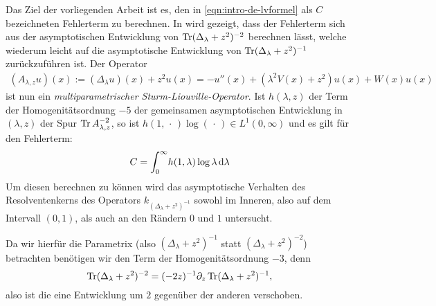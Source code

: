Das Ziel der vorliegenden Arbeit ist es, den in \cref{eqn:intro-de-lvformel} als
$C$ bezeichneten Fehlerterm zu berechnen. In \cite{LV13} wird gezeigt, dass der
Fehlerterm sich aus der asymptotischen Entwicklung von $\Tr(\Delta_\lambda +
z^2)^{-2}$ berechnen lässt, welche wiederum leicht auf die asymptotische
Entwicklung von $\Tr(\Delta_\lambda + z^2)^{-1}$ zurückzuführen ist. Der
Operator
\begin{align*}
  (A_{\lambda,z}u)(x) := (\Delta_\lambda u)(x) + z^2 u(x)
           = -u''(x) + (\lambda^2 V(x) + z^2) u(x) + W(x) u(x)
\end{align*}
ist nun ein \emph{multiparametrischer Sturm-Liouville-Operator}. Ist $h(\lambda,
z)$ der Term der Homogenitätsordnung $-5$ der gemeinsamen asymptotischen
Entwicklung in $(\lambda,z)$ der Spur $\Tr A_{\lambda,z}^{-2}$, so ist
$h(1,\,\cdot\,)\log(\,\cdot\,)\in L^1(0,\infty)$ und es gilt für den Fehlerterm:
\begin{align*}
  C = \Integ[\infty]{0}{\lambda}{h(1,\lambda)\log\lambda}
\end{align*}
Um diesen berechnen zu können wird das asymptotische Verhalten des
Resolventenkerns des Operators $k_{(\Delta_\lambda + z^2)^{-1}}$ sowohl im
Inneren, also auf dem Intervall $(0,1)$, als auch an den Rändern $0$ und $1$
untersucht.

Da wir hierfür die Parametrix (also $(\Delta_\lambda + z^2)^{-1}$ statt
$(\Delta_\lambda + z^2)^{-2}$) betrachten benötigen wir den Term der
Homogenitätsordnung $-3$, denn
\begin{equation*}
  \Tr(\Delta_\lambda + z^2)^{-2} = (-2z)^{-1}\partial_z\Tr(\Delta_\lambda +
  z^2)^{-1},
\end{equation*}
also ist die eine Entwicklung um $2$ gegenüber der anderen verschoben.

